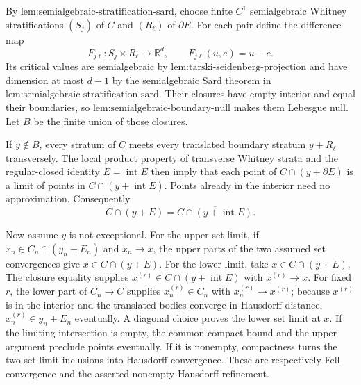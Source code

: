 By \(\text{lem:semialgebraic-stratification-sard}\), choose finite \(C^1\) semialgebraic Whitney stratifications \((S_j)\) of \(C\) and \((R_\ell)\) of \(\partial E\).  For each pair define the difference map
\[
 F_{j\ell}:S_j\times R_\ell\longrightarrow\mathbb R^d,
 \qquad F_{j\ell}(u,e)=u-e.
\]
Its critical values are semialgebraic by \(\text{lem:tarski-seidenberg-projection}\) and have dimension at most \(d-1\) by the semialgebraic Sard theorem in \(\text{lem:semialgebraic-stratification-sard}\).  Their closures have empty interior and equal their boundaries, so \(\text{lem:semialgebraic-boundary-null}\) makes them Lebesgue null.  Let \(B\) be the finite union of those closures.

If \(y\notin B\), every stratum of \(C\) meets every translated boundary stratum \(y+R_\ell\) transversely.  The local product property of transverse Whitney strata and the regular-closed identity \(E=\overline{\operatorname{int}E}\) then imply that each point of \(C\cap(y+\partial E)\) is a limit of points in \(C\cap(y+\operatorname{int}E)\).  Points already in the interior need no approximation.  Consequently
\[
 C\cap(y+E)=\overline{C\cap(y+\operatorname{int}E)}.
\]

Now assume \(y\) is not exceptional.  For the upper set limit, if \(x_n\in C_n\cap(y_n+E_n)\) and \(x_n\to x\), the upper parts of the two assumed set convergences give \(x\in C\cap(y+E)\).  For the lower limit, take \(x\in C\cap(y+E)\).  The closure equality supplies \(x^{(r)}\in C\cap(y+\operatorname{int}E)\) with \(x^{(r)}\to x\).  For fixed \(r\), the lower part of \(C_n\to C\) supplies \(x_n^{(r)}\in C_n\) with \(x_n^{(r)}\to x^{(r)}\); because \(x^{(r)}\) is in the interior and the translated bodies converge in Hausdorff distance, \(x_n^{(r)}\in y_n+E_n\) eventually.  A diagonal choice proves the lower set limit at \(x\).  If the limiting intersection is empty, the common compact bound and the upper argument preclude points eventually.  If it is nonempty, compactness turns the two set-limit inclusions into Hausdorff convergence.  These are respectively Fell convergence and the asserted nonempty Hausdorff refinement.
